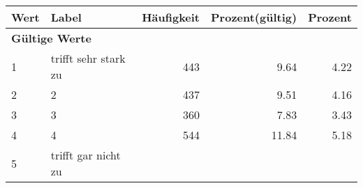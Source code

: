      \begin{longtable}{lXrrr}
     \toprule
     \textbf{Wert} & \textbf{Label} & \textbf{Häufigkeit} & \textbf{Prozent(gültig)} & \textbf{Prozent} \\
     \endhead
     \midrule
     \multicolumn{5}{l}{\textbf{Gültige Werte}}\\

     1 &
     \multicolumn{1}{X}{ trifft sehr stark zu   } &


       \num{443} &
       \num[round-mode=places,round-precision=2]{9,64} &
         \num[round-mode=places,round-precision=2]{4,22} \\

     2 &
     \multicolumn{1}{X}{ 2   } &


       \num{437} &
       \num[round-mode=places,round-precision=2]{9,51} &
         \num[round-mode=places,round-precision=2]{4,16} \\

     3 &
     \multicolumn{1}{X}{ 3   } &


       \num{360} &
       \num[round-mode=places,round-precision=2]{7,83} &
         \num[round-mode=places,round-precision=2]{3,43} \\

     4 &
     \multicolumn{1}{X}{ 4   } &


       \num{544} &
       \num[round-mode=places,round-precision=2]{11,84} &
         \num[round-mode=places,round-precision=2]{5,18} \\

     5 &
     \multicolumn{1}{X}{ trifft gar nicht zu   } &



\end{longtable}
